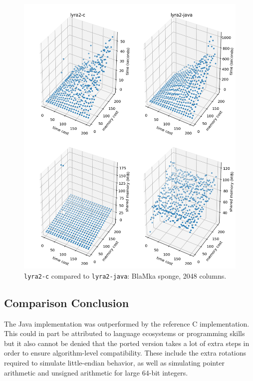 \begin{figure}[p]
    \centering
    \includegraphics[width=\linewidth,keepaspectratio]{figures/tcost_mcost_blamka_2048}
    \caption{\texttt{lyra2-c} compared to \texttt{lyra2-java}: BlaMka sponge, 2048 columns.}
    \label{figure:tcost_mcost_blamka_2048}
\end{figure}

\clearpage
\subsection{Comparison Conclusion}
\label{sec:comparison-conclusion}

The Java implementation was outperformed by the reference C implementation. This could in part be attributed to language ecosystems or programming skills but it also cannot be denied that the ported version takes a lot of extra steps in order to ensure algorithm-level compatibility. These include the extra rotations required to simulate little-endian behavior, as well as simulating pointer arithmetic and unsigned arithmetic for large 64-bit integers.

